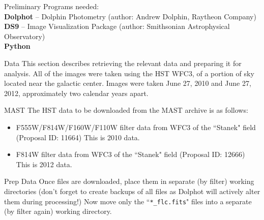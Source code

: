 \documentclass[12pt]{article}
\begin{document}
\begin{section}{Preliminary}
Programs needed: \\
\textbf{Dolphot} -- Dolphin Photometry (author: Andrew Dolphin, Raytheon Company) \\
\textbf{DS9} -- Image Visualization Package (author: Smithsonian Astrophysical Observatory) \\
\textbf{Python}


\end{section}
\begin{section}{Data}
This section describes retrieving the relevant data and preparing it for analysis. All of the images were taken using the HST WFC3, of a portion of sky located near the galactic center. Images were taken June 27, 2010 and June 27, 2012, approximately two calendar years apart.
\begin{subsection}{MAST}
The HST data to be downloaded from the MAST archive is as follows: \\
\begin{itemize}
\item F555W/F814W/F160W/F110W filter data from WFC3 of the ``Stanek" field (Proposal ID: 11664) This is 2010 data.
\item F814W filter data from WFC3 of the ``Stanek" field (Proposal ID: 12666) This is 2012 data.
\end{itemize}
\end{subsection}

\begin{subsection}{Prep Data}
Once files are downloaded, place them in separate (by filter) working directories (don't forget to create backups of all files as Dolphot will actively alter them during processing!) Now move only the ``\texttt{*\_flc.fits}" files into a separate (by filter again) working directory. 
\end{subsection}
\end{section}
\end{document}
